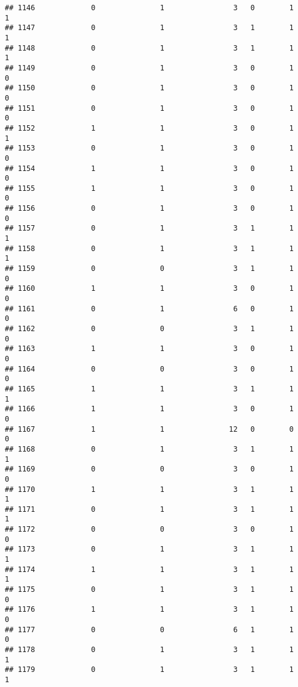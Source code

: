 \documentclass[]{article}
\begin{document}
\begin{verbatim}
## 1146             0               1                3   0        1        1
## 1147             0               1                3   1        1        1
## 1148             0               1                3   1        1        1
## 1149             0               1                3   0        1        0
## 1150             0               1                3   0        1        0
## 1151             0               1                3   0        1        0
## 1152             1               1                3   0        1        1
## 1153             0               1                3   0        1        0
## 1154             1               1                3   0        1        0
## 1155             1               1                3   0        1        0
## 1156             0               1                3   0        1        0
## 1157             0               1                3   1        1        1
## 1158             0               1                3   1        1        1
## 1159             0               0                3   1        1        0
## 1160             1               1                3   0        1        0
## 1161             0               1                6   0        1        0
## 1162             0               0                3   1        1        0
## 1163             1               1                3   0        1        0
## 1164             0               0                3   0        1        0
## 1165             1               1                3   1        1        1
## 1166             1               1                3   0        1        0
## 1167             1               1               12   0        0        0
## 1168             0               1                3   1        1        1
## 1169             0               0                3   0        1        0
## 1170             1               1                3   1        1        1
## 1171             0               1                3   1        1        1
## 1172             0               0                3   0        1        0
## 1173             0               1                3   1        1        1
## 1174             1               1                3   1        1        1
## 1175             0               1                3   1        1        0
## 1176             1               1                3   1        1        0
## 1177             0               0                6   1        1        0
## 1178             0               1                3   1        1        1
## 1179             0               1                3   1        1        1

\end{verbatim}
\end{document}
